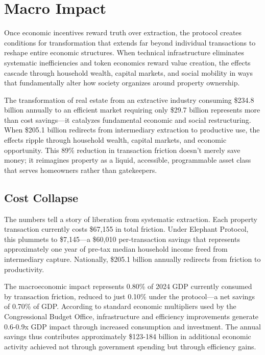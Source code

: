 \chapter{Macro Impact}

Once economic incentives reward truth over extraction, the protocol creates conditions for transformation that extends far beyond individual transactions to reshape entire economic structures. When technical infrastructure eliminates systematic inefficiencies and token economics reward value creation, the effects cascade through household wealth, capital markets, and social mobility in ways that fundamentally alter how society organizes around property ownership.

The transformation of real estate from an extractive industry consuming \$234.8 billion annually to an efficient market requiring only \$29.7 billion represents more than cost savings---it catalyzes fundamental economic and social restructuring. When \$205.1 billion redirects from intermediary extraction to productive use, the effects ripple through household wealth, capital markets, and economic opportunity. This 89\% reduction in transaction friction doesn't merely save money; it reimagines property as a liquid, accessible, programmable asset class that serves homeowners rather than gatekeepers.

\section{Cost Collapse}

The numbers tell a story of liberation from systematic extraction. Each property transaction currently costs \$67,155 in total friction. Under Elephant Protocol, this plummets to \$7,145---a \$60,010 per-transaction savings that represents approximately one year of pre-tax median household income freed from intermediary capture. Nationally, \$205.1 billion annually redirects from friction to productivity.

The macroeconomic impact represents 0.80\% of 2024 GDP currently consumed by transaction friction, reduced to just 0.10\% under the protocol---a net savings of 0.70\% of GDP. According to standard economic multipliers used by the Congressional Budget Office, infrastructure and efficiency improvements generate 0.6-0.9x GDP impact through increased consumption and investment. The annual savings thus contributes approximately \$123-184 billion in additional economic activity achieved not through government spending but through efficiency gains.


